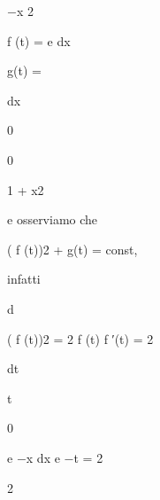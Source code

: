 \documentclass[a4paper,portrait,12pt]{article}
\begin{document}
\begin{flushleft}
$-$x 2
\end{flushleft}


\begin{flushleft}
f (t) = e dx
\end{flushleft}


\begin{flushleft}
g(t) =
\end{flushleft}


\begin{flushleft}
dx
\end{flushleft}


0


0


\begin{flushleft}
1 + x2
\end{flushleft}


\begin{flushleft}
e osserviamo che
\end{flushleft}


\begin{flushleft}
( f (t))2 + g(t) = const,
\end{flushleft}


\begin{flushleft}
infatti
\end{flushleft}


\begin{flushleft}
d
\end{flushleft}


\begin{flushleft}
( f (t))2 = 2 f (t) f ′(t) = 2
\end{flushleft}


\begin{flushleft}
dt
\end{flushleft}





\begin{flushleft}
t
\end{flushleft}


0





\begin{flushleft}
e $-$x dx e $-$t = 2
\end{flushleft}


2
\end{document}
